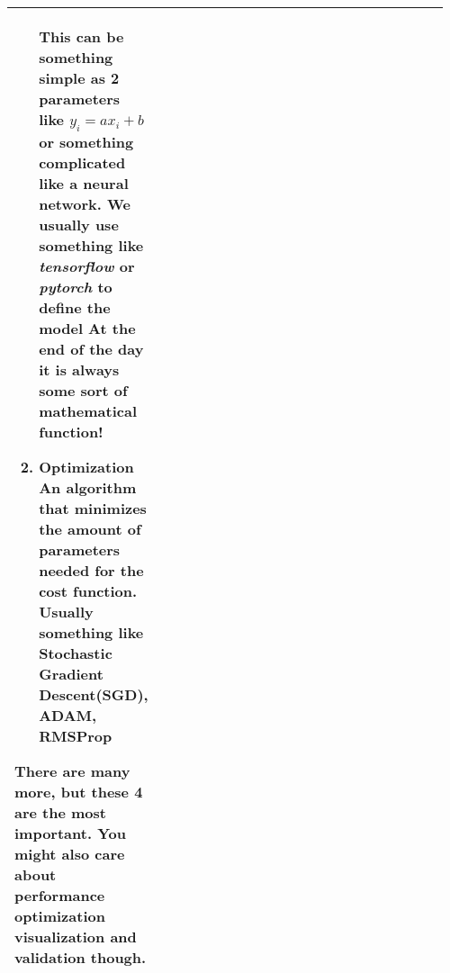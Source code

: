 \documentclass[main.tex,fontsize=8pt,paper=a4,paper=portrait,DIV=calc,]{scrartcl}
\begin{document}
\begin{table}[h!]
\begin{tabular}{|m{0.2\linewidth}|m{0.755\linewidth}|}
\begin{enumerate}
This can be something simple as 2 parameters like \(y_i = ax_i + b\) or something complicated like a neural network.\newline
We usually use something like \emph{tensorflow} or \emph{pytorch} to define the model\newline
At the end of the day it is always some sort of \textbf{mathematical function!}
\item Optimization
An algorithm that minimizes the amount of parameters needed for the cost function. \newline
Usually something like Stochastic Gradient Descent(SGD), ADAM, RMSProp 
\end{enumerate}
\vspace{2mm}
There are many more, but these 4 are the most important. You might also care about performance optimization\newline
visualization and validation though.\\
\hline
\end{tabular}

\end{table}
\end{document}
